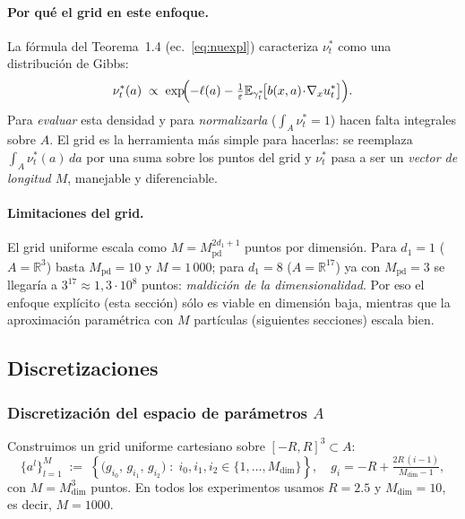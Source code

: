\documentclass[11pt, a4paper]{article}
\theoremstyle{definition}
\newcommand{\eps}{\varepsilon}
\begin{document}
\paragraph{Por qué el grid en este enfoque.}
La fórmula del Teorema~1.4
(ec.~\ref{eq:nuexpl}) caracteriza $\nu_t^*$ como una distribución
de Gibbs:
\[
  \nu_t^*(a) \;\propto\; \exp\!\Bigl(-\ell(a) - \tfrac{1}{\eps}
  \mathbb E_{\gamma_t^*}\!\bigl[b(x, a)\!\cdot\!\nabla_x u_t^*\bigr]\Bigr).
\]
Para \emph{evaluar} esta densidad y para \emph{normalizarla}
($\int_A \nu_t^* = 1$) hacen falta integrales sobre $A$. El grid es
la herramienta más simple para hacerlas: se reemplaza
$\int_A \nu_t^*(a)\, da$ por una suma sobre los puntos del grid y
$\nu_t^*$ pasa a ser un \emph{vector de longitud $M$}, manejable y
diferenciable.

\paragraph{Limitaciones del grid.}
El grid uniforme escala como $M = M_{\mathrm{pd}}^{2 d_1 + 1}$
puntos por dimensión. Para $d_1 = 1$ ($A = \mathbb R^3$) basta
$M_{\mathrm{pd}} = 10$ y $M = 1\,000$; para $d_1 = 8$
($A = \mathbb R^{17}$) ya con $M_{\mathrm{pd}} = 3$ se llegaría a
$3^{17} \approx 1{,}3 \cdot 10^8$ puntos: \emph{maldición de la
dimensionalidad}. Por eso el enfoque explícito (esta sección) sólo
es viable en dimensión baja, mientras que la aproximación
paramétrica con $M$ partículas (siguientes secciones) escala bien.

\subsection{Discretizaciones}
\label{ssec:discret}

\subsubsection{Discretización del espacio de parámetros $A$}

Construimos un grid uniforme cartesiano sobre $[-R, R]^3 \subset A$:
\begin{equation}
  \{a^l\}_{l=1}^{M} \;:=\; \left\{
  \bigl( g_{i_0},\, g_{i_1},\, g_{i_2} \bigr)
  \;:\; i_0, i_1, i_2 \in \{1, \dots, M_{\mathrm{dim}}\}
  \right\},
  \quad
  g_i = -R + \tfrac{2R\,(i-1)}{M_{\mathrm{dim}} - 1},
\end{equation}
con $M = M_{\mathrm{dim}}^3$ puntos. En todos los experimentos usamos
$R = 2.5$ y $M_{\mathrm{dim}} = 10$, es decir, $M = 1000$.
\end{document}
